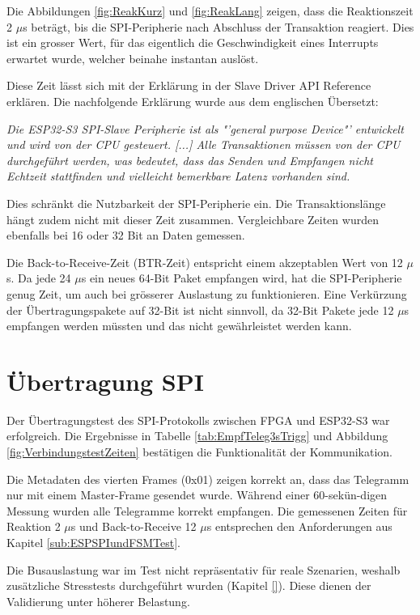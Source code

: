 Die Abbildungen \ref{fig:ReakKurz} und \ref{fig:ReakLang} zeigen, dass die Reaktionszeit 2 $\mu$s beträgt, bis die SPI-Peripherie nach Abschluss der Transaktion reagiert. Dies ist ein grosser Wert, für das eigentlich die Geschwindigkeit eines Interrupts erwartet wurde, welcher beinahe instantan auslöst.

Diese Zeit lässt sich mit der Erklärung in der Slave Driver API Reference erklären. Die nachfolgende Erklärung wurde aus dem englischen Übersetzt: 

\textit{Die ESP32-S3 SPI-Slave Peripherie ist als "'general purpose Device"' entwickelt und wird von der CPU gesteuert. [...] Alle Transaktionen müssen von der CPU durchgeführt werden, was bedeutet, dass das Senden und Empfangen nicht Echtzeit stattfinden und vielleicht bemerkbare Latenz vorhanden sind.} \cite{SPI_SLAVE_DRIVER_API}

Dies schränkt die Nutzbarkeit der SPI-Peripherie ein. Die Transaktionslänge hängt zudem nicht mit dieser Zeit zusammen. Vergleichbare Zeiten wurden ebenfalls bei 16 oder 32 Bit an Daten gemessen. 

Die Back-to-Receive-Zeit (BTR-Zeit) entspricht einem akzeptablen Wert von 12 $\mu$s. Da jede 24 $\mu$s ein neues 64-Bit Paket empfangen wird, hat die SPI-Peripherie genug Zeit, um auch bei grösserer Auslastung zu funktionieren. Eine Verkürzung der Übertragungspakete auf 32-Bit ist nicht sinnvoll, da 32-Bit Pakete jede 12 $\mu$s empfangen werden müssten und das nicht gewährleistet werden kann. 

\section{Übertragung SPI}
\label{sec:DiskussionÜbertragungSPI}

Der Übertragungstest des SPI-Protokolls zwischen FPGA und ESP32-S3 war erfolgreich. Die Ergebnisse in Tabelle \ref{tab:EmpfTeleg3sTrigg} und Abbildung \ref{fig:VerbindungstestZeiten} bestätigen die Funktionalität der Kommunikation.

Die Metadaten des vierten Frames (0x01) zeigen korrekt an, dass das Telegramm nur mit einem Master-Frame gesendet wurde. Während einer 60-sekün-digen Messung wurden alle Telegramme korrekt empfangen. Die gemessenen Zeiten für Reaktion 2 $\mu$s und Back-to-Receive 12 $\mu$s entsprechen den Anforderungen aus Kapitel \ref{sub:ESPSPIundFSMTest}.

Die Busauslastung war im Test nicht repräsentativ für reale Szenarien, weshalb zusätzliche Stresstests durchgeführt wurden (Kapitel \ref{}). Diese dienen der Validierung unter höherer Belastung.

